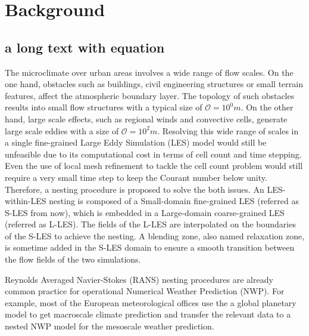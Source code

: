 \chapter{Background}
\label{sec: Background}


\section{a long text with equation}
\label{sec: a long text with equation}

The microclimate over urban areas involves a wide range of flow scales. On the one hand, obstacles such as buildings, civil engineering structures or small  terrain features, affect the atmospheric boundary layer. The topology of such obstacles results into small flow structures with a typical size of $\mathcal{O}=10^{0}m$. On the other hand, large scale effects, such as regional winds and convective cells, generate large scale eddies with a size of $\mathcal{O}=10^{2}m$. Resolving this wide range of scales in a single fine-grained Large Eddy Simulation (LES) model would still be unfeasible due to its computational cost in terms of cell count and time stepping. Even the use of local mesh refinement to tackle the cell count problem would still require a very small time step to keep the Courant number below unity. Therefore, a nesting procedure is proposed to solve the both issues. An LES-within-LES nesting is composed of a Small-domain fine-grained LES (referred as S-LES from now), which is embedded in a Large-domain coarse-grained LES (referred as L-LES). The fields of the L-LES are interpolated on the boundaries of the S-LES to achieve the nesting. A blending zone, also named relaxation zone, is sometime added in the S-LES domain to ensure a smooth transition between the flow fields of the two simulations.

Reynolds Averaged Navier-Stokes (RANS) nesting procedures are already common practice for operational Numerical Weather Prediction (NWP). For example, most of the European meteorological offices use the a global planetary model to get macroscale climate prediction and transfer the relevant data to a nested NWP model for the mesoscale weather prediction.

